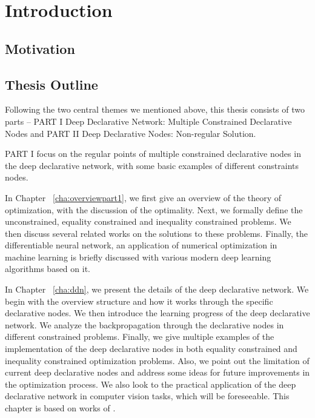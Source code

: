 \chapter{Introduction}
\label{cha:intro}

\section{Motivation}
\label{sec:motivation}




\section{Thesis Outline}
\label{sec:outline}
Following the two central themes we mentioned above, this thesis consists of two parts -- PART I Deep Declarative Network: Multiple Constrained Declarative Nodes and PART II Deep Declarative Nodes: Non-regular Solution. 
\par PART I focus on the regular points of multiple constrained declarative nodes in the deep declarative network, with some basic examples of different constraints nodes. 
\begin{description}
    \item In Chapter ~\ref{cha:overviewpart1}, we first give an overview of the theory of optimization, with the discussion of the optimality. Next, we formally define the unconstrained, equality constrained and inequality constrained problems. We then discuss several related works on the solutions to these problems. Finally, the differentiable neural network, an application of numerical optimization in machine learning is briefly discussed with various modern deep learning algorithms based on it. 
    \item In Chapter ~\ref{cha:ddn}, we present the details of the deep declarative network. We begin with the overview structure and how it works through the specific declarative nodes. We then introduce the learning progress of the deep declarative network. We analyze the backpropagation through the declarative nodes in different constrained problems. Finally, we give multiple examples of the implementation of the deep declarative nodes in both equality constrained and inequality constrained optimization problems. Also, we point out the limitation of current deep declarative nodes and address some ideas for future improvements in the optimization process. We also look to the practical application of the deep declarative network in computer vision tasks, which will be foreseeable. This chapter is based on works of \cite{SG:19}. 
\end{description}


